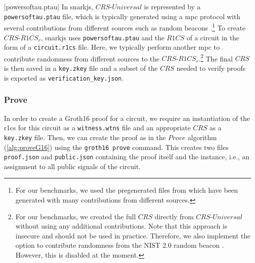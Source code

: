 |powersoftau.ptau|
In snarkjs, $CRS\text{-}Universal$ is represented by a \verb|powersoftau.ptau| file, which is typically generated using a \gls{mpc} protocol with several contributions from different sources such as random beacons \cite{nicolas_gailly_league_2025,popper_powers--tau_2024,bowe_scalable_2017}.\footnote{
    For our benchmarks, we used the pregenerated \protect{} files from \cite{jordi_baylina_iden3snarkjs_2025} which have been generated with many contributions from different sources.
}
To create $CRS\text{-}R1CS_r$, snarkjs uses \verb|powersoftau.ptau| and the $R1CS$ of a circuit in the form of a \verb|circuit.r1cs| file.
Here, we typically perform another \gls{mpc} to contribute randomness from different sources to the $CRS\text{-}R1CS_r$.\footnote{
    For our benchmarks, we created the full $CRS$ directly from $CRS\text{-}Universal$ without using any additional contributions.
    Note that this approach is insecure and should not be used in practice.
    Therefore, we also implement the option to contribute randomness from the NIST 2.0 random beacon \cite{computer_security_division_nist_2019}.
    However, this is disabled at the moment.
}
The final $CRS$ is then saved in a \verb|key.zkey| file and a subset of the $CRS$ needed to verify proofs is exported as \verb|verification_key.json|.



\subsubsection{Prove}
\label{section:software:snarkjsProve}
In order to create a Groth16 proof for a circuit, we require an instantiation of the \gls{r1cs} for this circuit as a \verb|witness.wtns| file and an appropriate $CRS$ as a \verb|key.zkey| file.
Then, we can create the proof as in the $Prove$ algorithm (\cref{alg:proveG16}) using the \verb|groth16 prove| command.
This creates two files \verb|proof.json| and \verb|public.json| containing the proof itself and the instance, i.e., an assignment to all public signals of the circuit.


